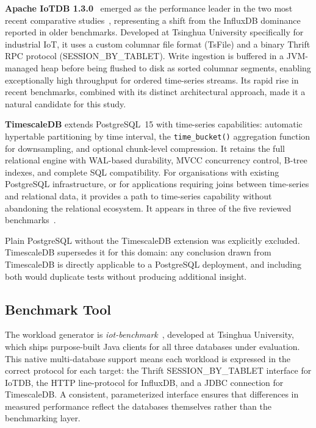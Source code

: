 \textbf{Apache IoTDB 1.3.0}~\cite{wang2023iotdb} emerged as the performance leader in
the two most recent comparative studies~\cite{pereira2023mulletbench,wang2023iotdb},
representing a shift from the InfluxDB dominance reported in older benchmarks.
Developed at Tsinghua University specifically for industrial IoT, it uses a custom columnar
file format (TsFile) and a binary Thrift RPC protocol (SESSION\_BY\_TABLET). Write ingestion
is buffered in a JVM-managed heap before being flushed to disk as sorted columnar segments,
enabling exceptionally high throughput for ordered time-series streams. Its rapid rise in
recent benchmarks, combined with its distinct architectural approach, made it a natural
candidate for this study.

\textbf{TimescaleDB} extends PostgreSQL~15 with time-series capabilities: automatic
hypertable partitioning by time interval, the \texttt{time\_bucket()} aggregation function
for downsampling, and optional chunk-level compression. It retains the full relational engine
with WAL-based durability, MVCC concurrency control, B-tree indexes, and complete SQL
compatibility. For organisations with existing PostgreSQL infrastructure, or for applications
requiring joins between time-series and relational data, it provides a path to time-series
capability without abandoning the relational ecosystem. It appears in three of the five
reviewed benchmarks~\cite{shah2022performance,lima2024avaliando,wang2023iotdb}.

Plain PostgreSQL without the TimescaleDB extension was explicitly excluded. TimescaleDB
supersedes it for this domain: any conclusion drawn from TimescaleDB is directly applicable
to a PostgreSQL deployment, and including both would duplicate tests without producing
additional insight.

\subsection{Benchmark Tool}
\label{sec:benchmark-tool}

The workload generator is \textit{iot-benchmark}~\cite{iotbenchmark}, developed at Tsinghua
University, which ships purpose-built Java clients for all three databases under evaluation.
This native multi-database support means each workload is expressed in the correct protocol
for each target: the Thrift SESSION\_BY\_TABLET interface for IoTDB, the HTTP line-protocol
for InfluxDB, and a JDBC connection for TimescaleDB. A consistent, parameterized interface
ensures that differences in measured performance reflect the databases themselves rather
than the benchmarking layer.

